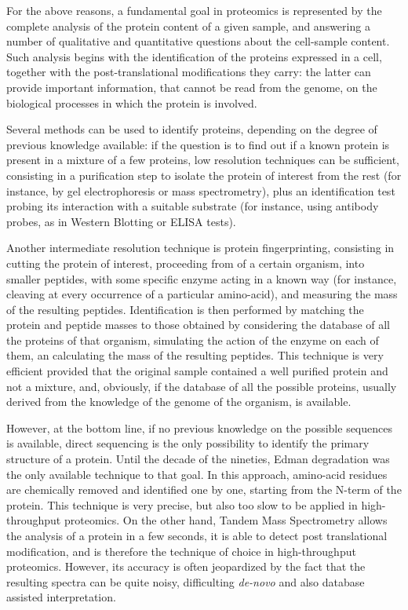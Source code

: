 For the above reasons, a fundamental goal in proteomics is represented by the complete
analysis of the protein content of a given sample, and answering a number of qualitative and
quantitative questions about the cell-sample content.
%
Such analysis begins with the identification of the proteins expressed in a
cell, together with the post-translational modifications they carry: the latter
can provide important information, that cannot be read from the genome, on the
biological processes in which the protein is involved.

Several methods can be used to identify proteins, depending on the degree of
previous knowledge available: if the question is to find out if a known protein
is present in a mixture of a few proteins, low resolution techniques can be
sufficient,  consisting in a purification step to isolate the protein of
interest from the rest (for instance, by gel electrophoresis or mass
spectrometry), plus an identification test probing its interaction with a
suitable substrate (for instance, using antibody probes, as in Western Blotting
or ELISA tests).

Another intermediate resolution technique is protein fingerprinting, consisting
in cutting the protein of interest, proceeding from of a certain organism, into
smaller peptides, with some specific enzyme acting in a known way (for instance,
cleaving at every occurrence of a particular amino-acid), and measuring the mass
of the resulting peptides. Identification is then performed by matching the
protein and peptide masses to those obtained by considering the database of all
the proteins of that organism, simulating the action of the enzyme on each of
them, an calculating the mass of the resulting peptides. This technique is very
efficient provided that the original sample contained a well purified protein
and not a mixture,  and, obviously, if the database of all the possible
proteins, usually derived from the knowledge of the genome of the organism, is
available.  

However, at the bottom line, if no previous knowledge on the possible sequences
is available, direct sequencing is the only possibility to identify the primary
structure of a protein.
Until the decade of the nineties, Edman degradation was the only available
technique to that goal. In this approach, amino-acid residues are chemically
removed and identified one by one, starting from the N-term of the protein.
This technique is very precise, but also too slow to be applied in
high-throughput proteomics.
On the other hand, Tandem Mass Spectrometry allows the analysis of a protein in a
few seconds, it is able to detect post translational modification, and is
therefore the technique of choice in high-throughput proteomics.
However, its accuracy is often jeopardized by the fact that the resulting
spectra can be quite noisy, difficulting \emph{de-novo} and also database
assisted interpretation.

